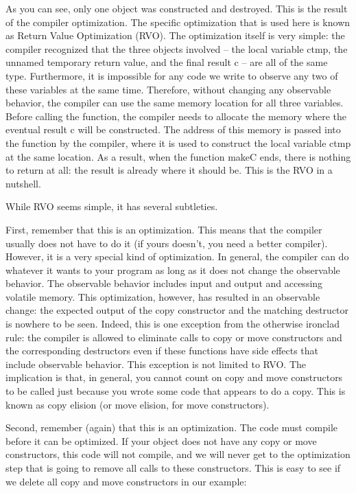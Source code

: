 As you can see, only one object was constructed and destroyed. This is the result of the compiler optimization. The specific optimization that is used here is known as Return Value Optimization (RVO). The optimization itself is very simple: the compiler recognized that the three objects involved – the local variable ctmp, the unnamed temporary return value, and the final result c – are all of the same type. Furthermore, it is impossible for any code we write to observe any two of these variables at the same time. Therefore, without changing any observable behavior, the compiler can use the same memory location for all three variables. Before calling the function, the compiler needs to allocate the memory where the eventual result c will be constructed. The address of this memory is passed into the function by the compiler, where it is used to construct the local variable ctmp at the same location. As a result, when the function makeC ends, there is nothing to return at all: the result is already where it should be. This is the RVO in a nutshell.

While RVO seems simple, it has several subtleties. 

First, remember that this is an optimization. This means that the compiler usually does not have to do it (if yours doesn’t, you need a better compiler). However, it is a very special kind of optimization. In general, the compiler can do whatever it wants to your program as long as it does not change the observable behavior. The observable behavior includes input and output and accessing volatile memory. This optimization, however, has resulted in an observable change: the expected output of the copy constructor and the matching destructor is nowhere to be seen. Indeed, this is one exception from the otherwise ironclad rule: the compiler is allowed to eliminate calls to copy or move constructors and the corresponding destructors even if these functions have side effects that include observable behavior. This exception is not limited to RVO. The implication is that, in general, you cannot count on copy and move constructors to be called just because you wrote some code that appears to do a copy. This is known as copy elision (or move elision, for move constructors).

Second, remember (again) that this is an optimization. The code must compile before it can be optimized. If your object does not have any copy or move constructors, this code will not compile, and we will never get to the optimization step that is going to remove all calls to these constructors. This is easy to see if we delete all copy and move constructors in our example:

